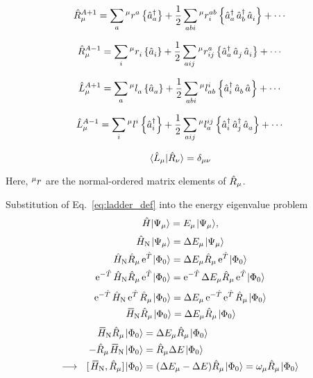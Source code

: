 \documentclass[thesis.tex]{subfiles}
\begin{document}
\begin{equation}
  \Rop^{A+1}_{\mu} = \sum_{a}\rint{\mu}{a}{}\normord{\co{a}} + \frac{1}{2}\sum_{abi}\rint{\mu}{ab}{i}\normord{\co{a}\co{b}\ao{i}} + \cdots
\end{equation}

\begin{equation}
  \Rop^{A-1}_{\mu} = \sum_{i}\rint{\mu}{}{i}\normord{\ao{i}} + \frac{1}{2}\sum_{aij}\rint{\mu}{a}{ij}\normord{\co{a}\ao{j}\ao{i}} + \cdots
\end{equation}

\begin{equation}
  \Lop^{A+1}_{\mu} = \sum_{a}\lint{\mu}{}{a}\normord{\ao{a}} + \frac{1}{2}\sum_{abi}\lint{\mu}{i}{ab}\normord{\co{i}\ao{b}\ao{}} + \cdots
\end{equation}

\begin{equation}
  \Lop^{A-1}_{\mu} = \sum_{i}\lint{\mu}{i}{}\normord{\co{i}} + \frac{1}{2}\sum_{aij}\lint{\mu}{ij}{a}\normord{\co{i}\co{j}\ao{a}} + \cdots
\end{equation}

\begin{equation}
  \braket{\Lop_{\mu}}{\Rop_{\nu}} = \delta_{\mu\nu}
\end{equation}

Here, $\rint{\mu}{}{}$ are the normal-ordered matrix elements of $\Rop_{\mu}$.

Substitution of Eq.\ \eqref{eq:ladder_def} into the energy eigenvalue problem
\begin{equation}
  \Ham\ket{\Psi_{\mu}} = E_{\mu}\ket{\Psi_{\mu}},
\end{equation}
\begin{gather}
  \HamN\ket{\Psi_{\mu}} = \Ecorr_{\mu}\ket{\Psi_{\mu}} \notag \\
  \HamN\Rop_{\mu}\E^{\Top}\refket = \Ecorr_{\mu}\Rop_{\mu}\E^{\Top}\refket \notag \\
  \E^{-\Top}\HamN\Rop_{\mu}\E^{\Top}\refket = \E^{-\Top}\Ecorr_{\mu}\Rop_{\mu}\E^{\Top}\refket
\end{gather}
\begin{gather}
  \E^{-\Top}\HamN\E^{\Top}\Rop_{\mu}\refket = \Ecorr_{\mu}\E^{-\Top}\E^{\Top}\Rop_{\mu}\refket \notag \\
  \EHamN\Rop_{\mu}\refket = \Ecorr_{\mu}\Rop_{\mu}\refket
\end{gather}
\begin{align}
  \EHamN\Rop_{\mu}\refket &= \Ecorr_{\mu}\Rop_{\mu}\refket \notag \\
  -\Rop_{\mu}\EHamN\refket &= \Rop_{\mu}\Ecorr\refket \notag \\
  \longrightarrow\ \ [\EHamN,\Rop_{\mu}]\refket &= (\Ecorr_{\mu} - \Ecorr)\Rop_{\mu}\refket = \omega_{\mu}\Rop_{\mu}\refket
\end{align}
\end{document}
